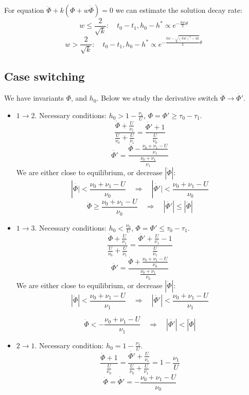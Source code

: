 \documentclass[12pt]{article}
\begin{document}
For equation $\ddot{\Phi} + k (\Phi + w \dot{\Phi}) = 0$ we can estimate the solution decay rate:
$$ w \leq \frac{2}{\sqrt{k}}: \quad t_0 - t_1, h_0 - h^* \propto e^{-\frac{kw}{2} \theta}$$ 
$$w > \frac{2}{\sqrt{k}}: \quad t_0 - t_1, h_0 - h^* \propto e^{-\frac{kw - \sqrt{(kw)^2 - 4k}}{2}\theta}$$

\subsection*{Case switching}

We have invariants $\Phi$, and $h_0$. Below we study the derivative switch $ \dot{\Phi} \to \dot{\Phi'} $. 

\begin{itemize}

	\item $1 \to 2$. Necessary conditions: $h_0 > 1 - \frac{\nu_1}{U}$, $\Phi = \Phi' \geq \tau_0 - \tau_1$.
$$ \frac{\dot{\Phi} + \frac{U}{\nu_1}}{\frac{U}{\nu_0} + \frac{U}{\nu_1}} = \frac{\dot{\Phi'} + 1}{\frac{U}{\nu_0}}$$		
$$ \dot{\Phi'} = \frac{\dot{\Phi} - \frac{ \nu_0 + \nu_1 - U }{\nu_1} }{\frac{\nu_0 + \nu_1}{\nu_1}} $$
We are either close to equilibrium, or decrease $|\dot{\Phi}|$:
$$  |\dot{\Phi |} < \frac{\nu_0 + \nu_1 - U}{\nu_0} \quad \Rightarrow \quad  | \dot{\Phi'}| < \frac{\nu_0 + \nu_1 - U}{\nu_0} $$
$$ \dot{\Phi} \geq \frac{\nu_0 + \nu_1 - U}{\nu_0}  \quad \Rightarrow \quad |\dot{\Phi'}| \leq |\dot{\Phi}| $$

	\item $1 \to 3$. Necessary conditions: $h_0 < \frac{\nu_0}{U}$, $\Phi = \Phi' \leq \tau_0 - \tau_1$.
$$  \frac{\dot{\Phi} + \frac{U}{\nu_1}}{\frac{U}{\nu_0} + \frac{U}{\nu_1}} = \frac{\dot{\Phi'} + \frac{U}{\nu_1} - 1}{\frac{U}{\nu_1}} $$
$$ \dot{\Phi'} = \frac{ \dot{\Phi} + \frac{\nu_0 + \nu_1 - U}{\nu_0} }{ \frac{\nu_0 + \nu_1}{\nu_0} } $$
 We are either close to equilibrium, or decrease $|\dot{\Phi}|$:
$$ |\dot{\Phi}| < \frac{\nu_0 + \nu_1 - U}{\nu_1} \quad \Rightarrow \quad |\dot{\Phi'}| < \frac{\nu_0 + \nu_1 - U}{\nu_1}$$

$$ \dot{\Phi} < - \frac{\nu_0 + \nu_1 - U}{\nu_1} \quad \Rightarrow \quad |\dot{\Phi'}| < |\dot{\Phi}|$$

	\item $2 \to 1$. Necessary condition: $h_0 = 1 - \frac{\nu_1}{U}$.
$$     \frac{\dot{\Phi} + 1}{\frac{U}{\nu_0}} = \frac{\dot{\Phi'} + \frac{U}{\nu_1}}{\frac{U}{\nu_0} + \frac{U}{\nu_1}} = 1 - \frac{\nu_1}{U} $$
 $$ \dot{\Phi}= \dot{\Phi'} = - \frac{\nu_0 + \nu_1 - U}{\nu_0}$$


\end{itemize}
\end{document}
